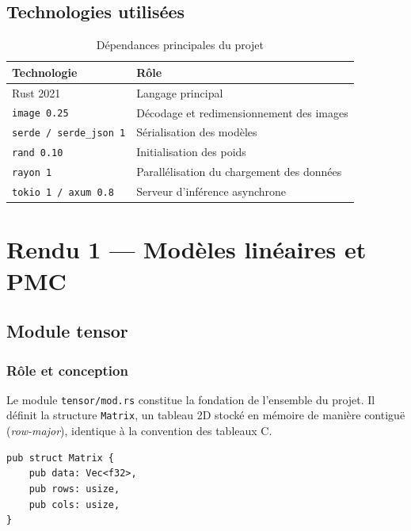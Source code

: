 \documentclass[12pt, a4paper]{report}
\begin{document}
\section{Technologies utilisées}

\begin{table}[H]
\centering
\begin{tabular}{ll}
\toprule
\textbf{Technologie} & \textbf{Rôle} \\
\midrule
Rust 2021 & Langage principal \\
\texttt{image 0.25} & Décodage et redimensionnement des images \\
\texttt{serde / serde\_json 1} & Sérialisation des modèles \\
\texttt{rand 0.10} & Initialisation des poids \\
\texttt{rayon 1} & Parallélisation du chargement des données \\
\texttt{tokio 1 / axum 0.8} & Serveur d'inférence asynchrone \\
\bottomrule
\end{tabular}
\caption{Dépendances principales du projet}
\end{table}

\chapter{Rendu 1 — Modèles linéaires et PMC}

\section{Module tensor}

\subsection{Rôle et conception}


Le module \texttt{tensor/mod.rs} constitue la fondation de l'ensemble
du projet. Il définit la structure \texttt{Matrix}, un tableau 2D stocké
en mémoire de manière contiguë (\textit{row-major}), identique à la
convention des tableaux C.

\begin{lstlisting}[caption={Structure Matrix}]
pub struct Matrix {
    pub data: Vec<f32>,
    pub rows: usize,
    pub cols: usize,
}
\end{lstlisting}
\end{document}
